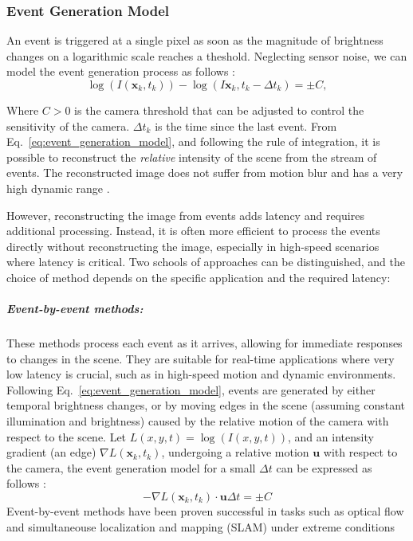 \documentclass{article}
\begin{document}
\subsubsection{Event Generation Model}
An event is triggered at a single pixel as soon as the magnitude of brightness changes on a logarithmic scale reaches a theshold. Neglecting sensor noise, we can model the event generation process as follows \cite{gallegoEventbasedVisionSurvey2022}:
\begin{equation}
    \log(I(\textbf{x}_k,t_k)) - \log(I\textbf{x}_k,t_k-\Delta t_k) = \pm C,
    \label{eq:event_generation_model}
\end{equation}
    
Where $C>0$ is the camera threshold that can be adjusted to control the sensitivity of the camera. $\Delta t_k$ is the time since the last event. From Eq.~\eqref{eq:event_generation_model}, and following the rule of integration, it is possible to reconstruct the \textit{relative} intensity of the scene from the stream of events. The reconstructed image does not suffer from motion blur and has a very high dynamic range \cite{rebecqHighSpeedHigh2019}. 

However, reconstructing the image from events adds latency and requires additional processing. Instead, it is often more efficient to process the events directly without reconstructing the image, especially in high-speed scenarios where latency is critical. Two schools of approaches can be distinguished, and the choice of method depends on the specific application and the required latency:

\subparagraph{Event-by-event methods:} These methods process each event as it arrives, allowing for immediate responses to changes in the scene. They are suitable for real-time applications where very low latency is crucial, such as in high-speed motion and dynamic environments. Following Eq.~\eqref{eq:event_generation_model}, events are generated by either temporal brightness changes, or by moving edges in the scene (assuming constant illumination and brightness) caused by the relative motion of the camera with respect to the scene. Let $L(x,y,t)=\log(I(x,y,t))$, and an intensity gradient (an edge) $\nabla L(\textbf{x}_k,t_k)$, undergoing a relative motion $\textbf{u}$ with respect to the camera, the event generation model for a small $\Delta t$ can be expressed as follows \cite{gallegoEventbasedVisionSurvey2022, gallegoEventbasedCameraPose2015}:
\begin{equation}
    -\nabla L(\textbf{x}_k,t_k) \cdot \textbf{u}\Delta t = \pm C
    \label{eq:moving_edges_event}
\end{equation}
Event-by-event methods have been proven successful in tasks such as optical flow and simultaneouse localization and mapping (SLAM) under extreme conditions \cite{vidalUltimateSLAMCombining2018, cuadradoOpticalFlowEstimation2023,gehrigERAFTDenseOptical2021, sunAutonomousQuadrotorFlight2021}
\end{document}
